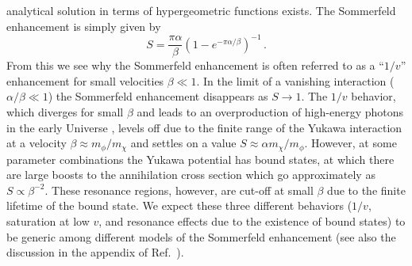 \documentclass[aps,prd,twocolumn,amsmath,amssymb,floatfix,nofootinbib,10pt]{revtex4}
\newcommand{\somm}{\ensuremath{S}}
\newcommand{\mdm}{\ensuremath{m_{\chi}}}
\newcommand{\mv}{\ensuremath{m_{\phi}}}
\begin{document}
analytical solution in terms of hypergeometric functions exists. The
Sommerfeld enhancement is simply given by
\begin{equation}
\somm = \frac{\pi \alpha}{\beta} (1 - e^{-\pi\alpha/\beta})^{-1}\, .
\end{equation}
From this we see why the Sommerfeld enhancement is often referred to
as a ``$1/v$'' enhancement for small velocities $\beta \ll 1$. In the
limit of a vanishing interaction ($\alpha/\beta \ll 1$) the Sommerfeld
enhancement disappears as $\somm \rightarrow 1$. The $1/v$ behavior,
which diverges for small $\beta$ and leads to an overproduction of
high-energy photons in the early Universe \cite{2008arXiv0810.3233K},
levels off due to the finite range of the Yukawa interaction at a
velocity $\beta \approx \mv/\mdm$ and settles on a value $\somm \approx
\alpha \mdm/\mv$. However, at some parameter combinations the Yukawa
potential has bound states, at which there are large boosts to the
annihilation cross section which go approximately as $\somm \propto
\beta^{-2}$. These resonance regions, however, are cut-off at small
$\beta$ due to the finite lifetime of the bound state. We expect these
three different behaviors ($1/v$, saturation at low $v$, and resonance
effects due to the existence of bound states) to be generic among
different models of the Sommerfeld enhancement (see also the
discussion in the appendix of Ref.~\cite{ArkaniHamed:2008qn}).
\end{document}
